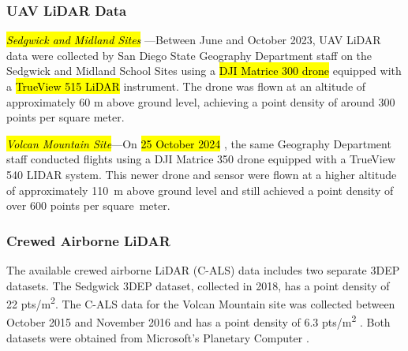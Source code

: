\documentclass[remotesensing,article,accept,pdftex,moreauthors]{Definitions/mdpi}
\begin{document}
\subsubsection{UAV LiDAR Data}
\textit{\hl{Sedgwick and Midland Sites}%
}---Between June and October 2023, UAV LiDAR data were collected by San Diego State Geography Department staff on the Sedgwick and Midland School Sites using a \hl{DJI Matrice 300 drone} %
 equipped with a \hl{TrueView 515 LiDAR}%
 instrument. The drone was flown at an altitude of approximately 60 m above ground level, achieving a point density of around 300 points per square meter. 

\textit{\hl{Volcan Mountain Site}}---On \hl{25 October 2024}%
, the same Geography Department staff conducted flights using a DJI Matrice 350 drone equipped with a TrueView 540 LIDAR system. This newer drone and sensor were flown at a higher altitude of approximately \mbox{110 m} above ground level and still achieved a point density of over 600 points per \mbox{square meter}.

\subsubsection{Crewed Airborne LiDAR}
The available crewed airborne LiDAR (C-ALS) data includes two separate 3DEP datasets. The Sedgwick 3DEP dataset, collected in 2018, has a point density of 22 pts/m\textsuperscript{2}. The C-ALS data for the Volcan Mountain site was collected between October 2015 and November 2016 and has a point density of 6.3 pts/m\textsuperscript{2} \citep{usgs_usgs_2016}. Both datasets were obtained from Microsoft's Planetary Computer \citep{us_geological_survey_3d_elevation_program_usgs_2023,planetary_computer}.
\end{document}
